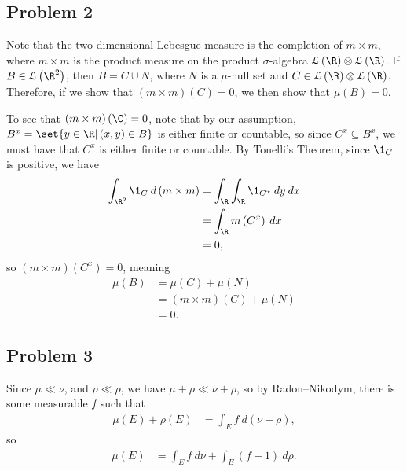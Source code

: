 \documentclass[10pt]{mypackage}
\begin{document}
\subsection{Problem 2}%
Note that the two-dimensional Lebesgue measure is the completion of $m\times m$, where $m\times m$ is the product measure on the product $\sigma$-algebra $\mathcal{L}\left( \R \right)\otimes \mathcal{L}\left( \R \right)$. If $B\in \mathcal{L}\left( \R^2 \right)$, then $B = C\cup N$, where $N$ is a $\mu$-null set and $C\in \mathcal{L}\left( \R \right)\otimes \mathcal{L}\left( \R \right)$. Therefore, if we show that $\left( m\times m \right)\left( C \right) = 0$, we then show that $\mu\left( B \right) = 0$.\newline

To see that $\left( m\times m \right)\left( \C \right) = 0$, note that by our assumption, $B^{x} = \set{y \in \R | \left( x,y \right)\in B}$ is either finite or countable, so since $C^{x}\subseteq B^{x}$, we must have that $C^{x}$ is either finite or countable. By Tonelli's Theorem, since $\1_{C}$ is positive, we have
\begin{align*}
  \int_{\R^{2}}^{} \1_{C}\:d\left( m\times m \right) &= \int_{\R}^{} \int_{\R}^{} \1_{C^{x}}\:dy\:dx\\
                                                     &= \int_{\R}^{} m\left( C^{x} \right)\:dx\\
                                                     &= 0,
\end{align*}
so $\left( m\times m \right)\left( C^{x} \right) = 0$, meaning
\begin{align*}
  \mu\left( B \right) &= \mu\left( C \right) + \mu\left( N \right)\\
                      &= \left( m\times m \right)\left( C \right) + \mu\left( N \right)\\
                      &= 0.
\end{align*}
\subsection{Problem 3}%
Since $\mu\ll\nu$, and $\rho\ll\rho$, we have $\mu + \rho \ll \nu + \rho$, so by Radon--Nikodym, there is some measurable $f$ such that
\begin{align*}
  \mu\left( E \right) + \rho\left( E \right) &= \int_{E}^{} f\:d\left( \nu + \rho \right),
\end{align*}
so
\begin{align*}
  \mu\left( E \right) &= \int_{E}^{} f\:d\nu + \int_{E}^{} \left( f-1 \right)\:d\rho.
\end{align*}
\end{document}
